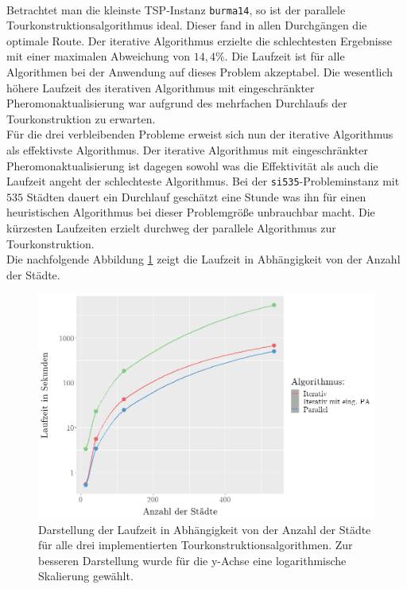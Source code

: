 \documentclass[doktyp=barbeit, sprache=german]{TUBAFarbeiten}
\begin{document}
\\Betrachtet man die kleinste TSP-Instanz \texttt{burma14}, so ist der parallele Tourkonstruktionsalgorithmus ideal. Dieser fand in allen Durchgängen die optimale Route. Der iterative Algorithmus erzielte die schlechtesten Ergebnisse mit einer maximalen Abweichung von $14,4 \%$. Die Laufzeit ist für alle Algorithmen bei der Anwendung auf dieses Problem akzeptabel. Die wesentlich höhere Laufzeit des iterativen Algorithmus mit eingeschränkter Pheromonaktualisierung war aufgrund des mehrfachen Durchlaufs der Tourkonstruktion zu erwarten.
\\Für die drei verbleibenden Probleme erweist sich nun der iterative Algorithmus als effektivste Algorithmus. Der iterative Algorithmus mit eingeschränkter Pheromonaktualisierung ist dagegen sowohl was die Effektivität als auch die Laufzeit angeht der schlechteste Algorithmus. Bei der \texttt{si535}-Probleminstanz mit $535$ Städten dauert ein Durchlauf geschätzt eine Stunde was ihn für einen heuristischen Algorithmus bei dieser Problemgröße unbrauchbar macht. Die kürzesten Laufzeiten erzielt durchweg der parallele Algorithmus zur Tourkonstruktion.
\\Die nachfolgende Abbildung \ref{img:runtimecity} zeigt die Laufzeit in Abhängigkeit von der Anzahl der Städte.
\begin{figure}[!]
\captionsetup{justification=centering}
  \centering
     \includegraphics[width=\textwidth]{images/diagramruntimes.png}
  \caption[Darstellung der Laufzeit in Abhängigkeit von der Anzahl der Städte für alle drei implementierten Tourkonstruktionsalgorithmen]{Darstellung der Laufzeit in Abhängigkeit von der Anzahl der Städte für alle drei implementierten Tourkonstruktionsalgorithmen. Zur besseren Darstellung wurde für die y-Achse eine logarithmische Skalierung gewählt.}
  \label{img:runtimecity}
\end{figure}
\end{document}
